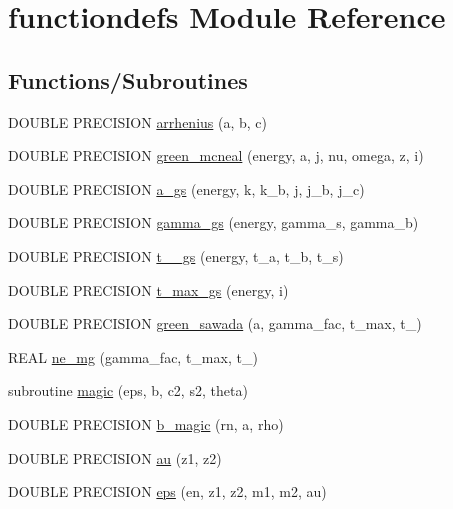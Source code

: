 \hypertarget{namespacefunctiondefs}{
\section{functiondefs Module Reference}
\label{namespacefunctiondefs}
}
\subsection*{Functions/Subroutines}
\begin{DoxyCompactItemize}
\item 
DOUBLE PRECISION \hyperlink{namespacefunctiondefs_ae9b1c95ccb465d122918ab89da45aed7}{arrhenius} (a, b, c)
\item 
DOUBLE PRECISION \hyperlink{namespacefunctiondefs_ad75756612cb12ba4983414cdc520f6a1}{green\_\-mcneal} (energy, a, j, nu, omega, z, i)
\item 
DOUBLE PRECISION \hyperlink{namespacefunctiondefs_a9cd4ed9f980bd43386e7de1e3e35c79c}{a\_\-gs} (energy, k, k\_\-b, j, j\_\-b, j\_\-c)
\item 
DOUBLE PRECISION \hyperlink{namespacefunctiondefs_adae12a3980d4e2bd5fe6277c91988474}{gamma\_\-gs} (energy, gamma\_\-s, gamma\_\-b)
\item 
DOUBLE PRECISION \hyperlink{namespacefunctiondefs_a5e1c4c25a7352f149e1f18854c37930f}{t\_\_\-gs} (energy, t\_\-a, t\_\-b, t\_\-s)
\item 
DOUBLE PRECISION \hyperlink{namespacefunctiondefs_a7beb6f6af6e15afda97da88dde407655}{t\_\-max\_\-gs} (energy, i)
\item 
DOUBLE PRECISION \hyperlink{namespacefunctiondefs_a64cc5970914d70f20e127be3722f11bb}{green\_\-sawada} (a, gamma\_\-fac, t\_\-max, t\_)
\item 
REAL \hyperlink{namespacefunctiondefs_abb5f2d51b3f8b637e0d17ad8c21db948}{ne\_\-mg} (gamma\_\-fac, t\_\-max, t\_)
\item 
subroutine \hyperlink{namespacefunctiondefs_a93c18b11591055e1e1275c6dc7b2ab26}{magic} (eps, b, c2, s2, theta)
\item 
DOUBLE PRECISION \hyperlink{namespacefunctiondefs_a34160b04b7880953967f273645a835c5}{b\_\-magic} (rn, a, rho)
\item 
DOUBLE PRECISION \hyperlink{namespacefunctiondefs_abf4df469161d4f4092a1a538a20ebf1d}{au} (z1, z2)
\item 
DOUBLE PRECISION \hyperlink{namespacefunctiondefs_ac20c2b09d0408eb23b226af7f8f7361a}{eps} (en, z1, z2, m1, m2, au)
\item 

\end{DoxyCompactItemize}
